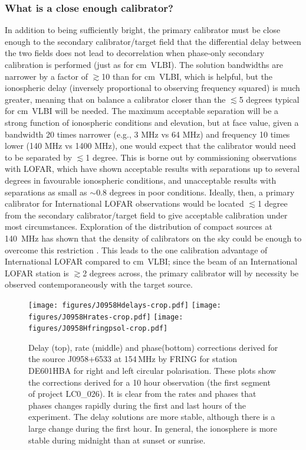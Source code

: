 \documentclass[graybox]{svmult}
\begin{document}
\subsubsection{What is a close enough calibrator?}
In addition to being sufficiently bright, the primary calibrator must be close
enough to the secondary calibrator/target field that the differential delay
between the two fields does not lead to decorrelation when phase-only secondary
calibration is performed (just as for cm~VLBI).  The solution bandwidths are
narrower by a factor of $\gtrsim$10 than for cm~VLBI, which is helpful, but the
ionospheric delay (inversely proportional to observing frequency squared) is
much greater, meaning that on balance a calibrator closer than the $\lesssim$5
degrees typical for cm~VLBI will be needed.  The maximum acceptable separation
will be a strong function of ionospheric conditions and elevation, but at face
value, given a bandwidth 20 times narrower (e.g., 3 MHz vs 64 MHz) and
frequency 10 times lower (140 MHz vs 1400 MHz), one would expect that the
calibrator would need to be separated by $\lesssim$1 degree.  This is borne out
by commissioning observations with LOFAR, which have shown acceptable results
with separations up to several degrees in favourable ionospheric conditions,
and unacceptable results with separations as small as $\sim$0.8 degrees in poor
conditions.  Ideally, then, a primary calibrator for International LOFAR
observations would be located $\lesssim$1 degree from the secondary
calibrator/target field to give acceptable calibration under most
circumstances. Exploration of the distribution of compact sources at 140~MHz
has shown that the density of calibrators on the sky could be enough to
overcome this restriction \citep{moldon15}. This leads to the one calibration
advantage of International LOFAR compared to cm~VLBI; since the beam of an
International LOFAR station is $\gtrsim$2 degrees across, the primary
calibrator will by necessity be observed contemporaneously with the target
source.


\begin{figure}[htbp]
\begin{center}
\texttt{[image: figures/J0958Hdelays-crop.pdf]}
\texttt{[image: figures/J0958Hrates-crop.pdf]}
\texttt{[image: figures/J0958Hfringpsol-crop.pdf]}
\caption{
Delay (top), rate (middle) and phase(bottom) corrections derived for the source
J0958+6533 at 154\,MHz by FRING for station DE601HBA for right and left
circular polarisation. These plots show the corrections derived for a 10 hour
observation (the first segment of project LC0\_026). It is clear from the rates
and phases that phases changes rapidly during the first and last hours of the
experiment. The delay solutions are more stable, although there is a large
change during the first hour. In general, the ionosphere is more stable during
midnight than at sunset or sunrise.  }

\end{center}
\end{figure}
\end{document}
